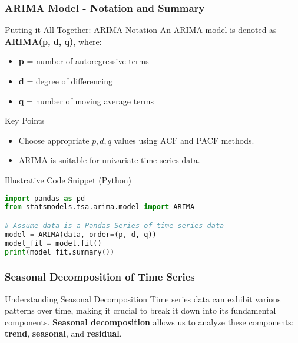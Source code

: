 \documentclass[aspectratio=169]{beamer}
\begin{document}
\begin{frame}[fragile]
    \frametitle{ARIMA Model - Notation and Summary}
    \begin{block}{Putting it All Together: ARIMA Notation}
        An ARIMA model is denoted as \textbf{ARIMA(p, d, q)}, where:
        \begin{itemize}
            \item \textbf{p} = number of autoregressive terms
            \item \textbf{d} = degree of differencing
            \item \textbf{q} = number of moving average terms
        \end{itemize}
    \end{block}

    \begin{block}{Key Points}
        \begin{itemize}
            \item Choose appropriate \(p, d, q\) values using ACF and PACF methods.
            \item ARIMA is suitable for univariate time series data.
        \end{itemize}
    \end{block}

    \begin{block}{Illustrative Code Snippet (Python)}
    \begin{lstlisting}[language=Python]
import pandas as pd
from statsmodels.tsa.arima.model import ARIMA

# Assume data is a Pandas Series of time series data
model = ARIMA(data, order=(p, d, q))
model_fit = model.fit()
print(model_fit.summary())
    \end{lstlisting}
    \end{block}
\end{frame}

\begin{frame}[fragile]
    \frametitle{Seasonal Decomposition of Time Series}
    \begin{block}{Understanding Seasonal Decomposition}
        Time series data can exhibit various patterns over time, making it crucial to break it down into its fundamental components. 
        \textbf{Seasonal decomposition} allows us to analyze these components: \textbf{trend}, \textbf{seasonal}, and \textbf{residual}.
    \end{block}
\end{frame}
\end{document}
